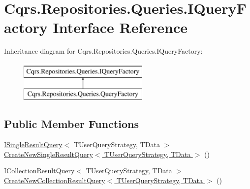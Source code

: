 \hypertarget{interfaceCqrs_1_1Repositories_1_1Queries_1_1IQueryFactory}{}\section{Cqrs.\+Repositories.\+Queries.\+I\+Query\+Factory Interface Reference}
\label{interfaceCqrs_1_1Repositories_1_1Queries_1_1IQueryFactory}
Inheritance diagram for Cqrs.\+Repositories.\+Queries.\+I\+Query\+Factory\+:\begin{figure}[H]
\begin{center}
\leavevmode
\includegraphics[height=2.000000cm]{interfaceCqrs_1_1Repositories_1_1Queries_1_1IQueryFactory}
\end{center}
\end{figure}
\subsection*{Public Member Functions}
\begin{DoxyCompactItemize}
\item 
\hyperlink{interfaceCqrs_1_1Repositories_1_1Queries_1_1ISingleResultQuery}{I\+Single\+Result\+Query}$<$ T\+User\+Query\+Strategy, T\+Data $>$ \hyperlink{interfaceCqrs_1_1Repositories_1_1Queries_1_1IQueryFactory_a237aee0f99d8bfc03d8f10595f16ecea_a237aee0f99d8bfc03d8f10595f16ecea}{Create\+New\+Single\+Result\+Query$<$ T\+User\+Query\+Strategy, T\+Data $>$} ()
\item 
\hyperlink{interfaceCqrs_1_1Repositories_1_1Queries_1_1ICollectionResultQuery}{I\+Collection\+Result\+Query}$<$ T\+User\+Query\+Strategy, T\+Data $>$ \hyperlink{interfaceCqrs_1_1Repositories_1_1Queries_1_1IQueryFactory_af8b443851e8112dc70cbc7fe32029ccb_af8b443851e8112dc70cbc7fe32029ccb}{Create\+New\+Collection\+Result\+Query$<$ T\+User\+Query\+Strategy, T\+Data $>$} ()
\end{DoxyCompactItemize}


